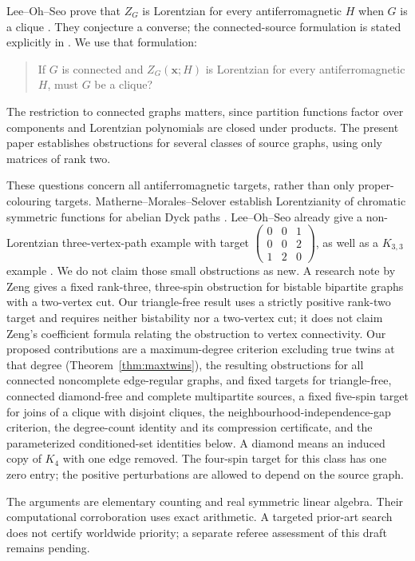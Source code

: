 \documentclass[11pt]{article}
\theoremstyle{remark}
\begin{document}
Lee--Oh--Seo prove that $Z_G$ is Lorentzian for every antiferromagnetic
$H$ when $G$ is a clique \cite[Theorem 3.1]{LOS}. They conjecture a
converse; the connected-source formulation is stated explicitly in
\cite[Section 6]{LS}. We use that formulation:
\begin{quote}
If $G$ is connected and $Z_G(\mathbf x;H)$ is Lorentzian for every
antiferromagnetic $H$, must $G$ be a clique?
\end{quote}
The restriction to connected graphs matters, since partition functions
factor over components and Lorentzian polynomials are closed under
products. The present paper establishes obstructions for several classes
of source graphs, using only matrices of rank two.

These questions concern all antiferromagnetic targets, rather than
only proper-colouring targets. Matherne--Morales--Selover establish
Lorentzianity of chromatic symmetric functions for abelian Dyck paths
\cite[Theorem 1.5]{MMS}. Lee--Oh--Seo already give a non-Lorentzian
three-vertex-path example with target
$\left(\begin{smallmatrix}0&0&1\\0&0&2\\1&2&0\end{smallmatrix}\right)$,
as well as a $K_{3,3}$ example \cite[Section 7]{LOS}. We do not claim
those small obstructions as new. A research note by Zeng
\cite{Zeng} gives a fixed rank-three, three-spin obstruction for
bistable bipartite graphs with a two-vertex cut. Our triangle-free
result uses a strictly positive rank-two target and requires neither
bistability nor a two-vertex cut; it does not claim Zeng's coefficient
formula relating the obstruction to vertex connectivity.
Our proposed contributions are a maximum-degree criterion excluding
true twins at that degree (Theorem~\ref{thm:maxtwins}), the resulting
obstructions for all connected noncomplete edge-regular graphs,
and fixed targets for triangle-free, connected diamond-free and complete
multipartite sources,
a fixed five-spin target for joins of a clique with disjoint cliques,
the neighbourhood-independence-gap criterion, the degree-count
identity and its compression certificate, and the parameterized
conditioned-set identities below. A diamond means an induced copy
of $K_4$ with one edge removed. The four-spin target for this class
has one zero entry; the positive perturbations are allowed to depend
on the source graph.

The arguments are elementary counting and real symmetric linear
algebra. Their computational corroboration uses exact arithmetic.
A targeted prior-art search does not certify worldwide priority; a
separate referee assessment of this draft remains pending.
\end{document}
